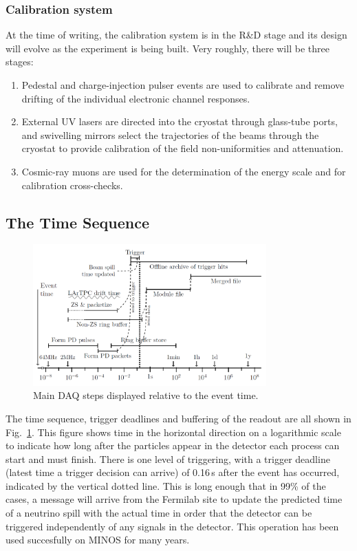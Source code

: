 \subsubsection{Calibration system}
At the time of writing, the calibration system is in the R\&D stage and its design will
evolve as the experiment is being built. Very roughly, there will be three stages:
\begin{enumerate}

\item Pedestal and charge-injection pulser events are used to calibrate and
remove drifting of the individual electronic channel responses.

\item External UV lasers are directed into the cryostat through glass-tube
ports, and swivelling mirrors select the trajectories of the beams
through the cryostat to provide calibration of the field
non-uniformities and attenuation.

\item Cosmic-ray muons are used for the determination of the energy scale and for calibration
cross-checks.

\end{enumerate}



\subsection{The Time Sequence}
\begin{figure}[h!]
	\centering
	\includegraphics[width=0.8\textwidth]{daq-steps.png}
	\caption{Main DAQ steps displayed relative to the event time.}
	\label{fig:fddaqtime}
\end{figure}

The time sequence, trigger deadlines and buffering of the readout are all
shown in Fig.~\ref{fig:fddaqtime}.  This figure shows time in the
horizontal direction on a logarithmic scale to indicate how long after
the particles appear in the detector each process can start and must
finish.  There is one level of triggering, with a trigger deadline
(latest time a trigger decision can arrive) of
0.16\,s after the event has occurred, indicated by the vertical dotted
line.  This is long enough that in 99\% of the cases, a message will
arrive from the Fermilab site to update the predicted time of a
neutrino spill with the actual time in order that the detector can be
triggered independently of any signals in the detector.  This
operation has been used succesfully on MINOS for many years.  

